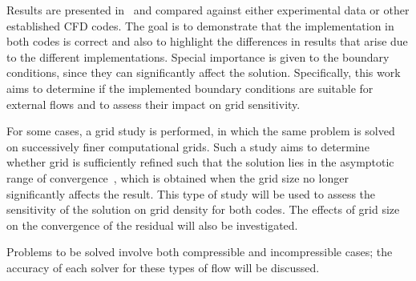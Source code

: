 Results are presented in~ and compared against either experimental data or other established CFD codes. The goal is to demonstrate that the implementation in both codes is correct and also to highlight the differences in results that arise due to the different implementations. Special importance is given to the boundary conditions, since they can significantly affect the solution. Specifically, this work aims to determine if the implemented boundary conditions are suitable for external flows and to assess their impact on grid sensitivity.

For some cases, a grid study is performed, in which the same problem is solved on successively finer computational grids. Such a study aims to determine whether grid is sufficiently refined such that the solution lies in the asymptotic range of convergence~\cite{roache1986editorial}, which is obtained when the grid size no longer significantly affects the result. This type of study will be used to assess the sensitivity of the solution on grid density for both codes. The effects of grid size on the convergence of the residual will also be investigated.

Problems to be solved involve both compressible and incompressible cases; the accuracy of each solver for these types of flow will be discussed.


